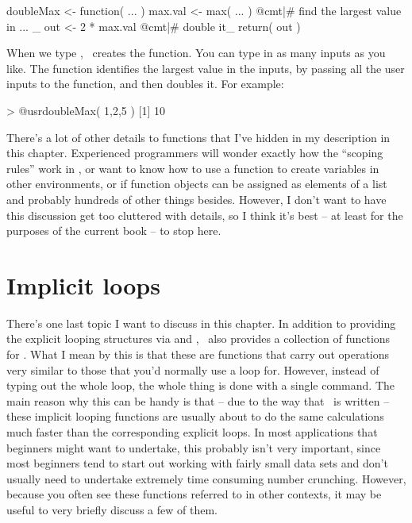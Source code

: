 \begin{script}
doubleMax <- function( ... ) {  
  max.val <- max( ... )   @cmt|# find the largest value in ... _
  out <- 2 * max.val      @cmt|# double it_ 
  return( out )
}
\end{script}
When we type , \R\ creates the  function. You can type in as many inputs as you like. The  function identifies the largest value in the inputs, by passing all the user inputs to the  function, and then doubles it. For example:
\begin{rblock1}
> @usr{doubleMax( 1,2,5 )}
[1] 10
\end{rblock1}


There's a lot of other details to functions that I've hidden in my description in this chapter. Experienced programmers will wonder exactly how the ``scoping rules'' work in \R, or want to know how to use a function to create variables in other environments, or if function objects can be assigned as elements of a list and probably hundreds of other things besides. However, I don't want to have this discussion get too cluttered with details, so I think it's best -- at least for the purposes of the current book -- to stop here.





\section{Implicit loops\label{sec:vectorised}}

There's one last topic I want to discuss in this chapter. In addition to providing the explicit looping structures via  and , \R\ also provides a collection of functions for . What I mean by this is that these are functions that carry out operations very similar to those that you'd normally use a loop for. However, instead of typing out the whole loop, the whole thing is done with a single command. The main reason why this can be handy is that -- due to the way that \R\ is written -- these implicit looping functions are usually about to do the same calculations much faster than the corresponding explicit loops. In most applications that beginners might want to undertake, this probably isn't very important, since most beginners tend to start out working with fairly small data sets and don't usually need to undertake extremely time consuming number crunching. However, because you often see these functions referred to in other contexts, it may be useful to very briefly discuss a few of them.

